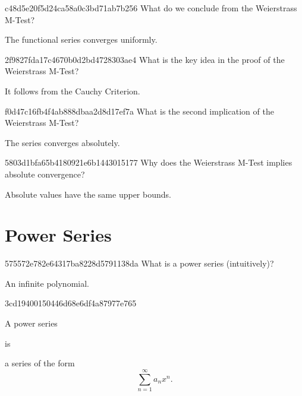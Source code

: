 \begin{note}{c48d5e20f5d24ca58a0c3bd71ab7b256}
    What do we conclude from the Weierstrass M-Test?

    \begin{cloze}{1}
        The functional series converges uniformly.
    \end{cloze}
\end{note}

\begin{note}{2f9827fda17c4670b0d2bd4728303ae4}
    What is the key idea in the proof of the Weierstrass M-Test?

    \begin{cloze}{1}
        It follows from the Cauchy Criterion.
    \end{cloze}
\end{note}

\begin{note}{f0d47c16fb4f4ab888dbaa2d8d17ef7a}
    What is the second implication of the Weierstrass M-Test?

    \begin{cloze}{1}
        The series converges absolutely.
    \end{cloze}
\end{note}

\begin{note}{5803d1bfa65b4180921e6b1443015177}
    Why does the Weierstrass M-Test implies absolute convergence?

    \begin{cloze}{1}
        Absolute values have the same upper bounds.
    \end{cloze}
\end{note}

\section{Power Series} %
\begin{note}{575572e782e64317ba8228d5791138da}
    What is a power series (intuitively)?

    \begin{cloze}{1}
        An infinite polynomial.
    \end{cloze}
\end{note}

\begin{note}{3cd19400150446d68e6df4a87977e765}
    \begin{icloze}{2}A power series\end{icloze} is
    \begin{icloze}{1}
        a series of the form
        \[
            \sum_{n=1}^{\infty} a_n x^{n}.
        \]
    \end{icloze}
\end{note}

